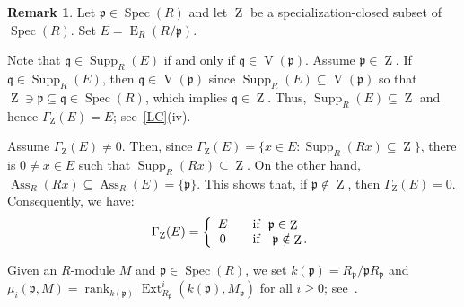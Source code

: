\documentclass[11pt]{amsart}
\theoremstyle{definition}
\theoremstyle{definition}
\newtheorem{rmk}[thm]{Remark}
\numberwithin{equation}{section}
\newcommand{\fp}{\mathfrak{p}}
\newcommand{\fq}{\mathfrak{q}}
\DeclareMathOperator{\Ass}{Ass}
\DeclareMathOperator{\V}{V}
\DeclareMathOperator{\IH}{E}
\DeclareMathOperator{\mz}{Z}
\DeclareMathOperator{\Ext}{Ext}
\DeclareMathOperator{\rank}{rank}
\DeclareMathOperator{\Supp}{Supp}
\DeclareMathOperator{\Spec}{Spec}
\begin{document}
\begin{rmk} \label{g-m} Let $\fp \in \Spec(R)$ and let $\mz$ be a specialization-closed subset of $\Spec(R)$. Set $E=\IH_R(R/\fp)$.

Note that $\fq \in \Supp_R(E)$ if and only if $\fq \in \V(\fp)$. Assume $\fp \in \mz$. If $\fq \in \Supp_R(E)$, then $\fq \in \V(\fp)$ since $\Supp_R(E)\subseteq \V(\fp)$  so that $\mz \owns \fp \subseteq \fq \in \Spec(R)$, which implies $\fq \in \mz$. Thus, $\Supp_R(E)\subseteq \mz$ and hence $\Gamma_{\mz}(E)=E$; see~\ref{LC}(iv).

Assume $\Gamma_{\mz}(E)\neq 0$. Then, since $\Gamma_{\mz}(E)=\{x\in E : \Supp_R(Rx)\subseteq\mz\}$, there is $0\neq x\in E$ such that $\Supp_R(Rx)\subseteq\mz$. On the other hand, $\Ass_R(Rx)\subseteq\Ass_R(E)=\{\fp\}$. This shows that, if $\fp \notin \mz$, then $\Gamma_{\mz}(E)=0$. Consequently, we have:
\begin{equation}\notag{} 
\Gamma_{\mz}(E)=\left\lbrace
\begin{array}{cl}
E\ \ & \text{ if}\ \ \fp\in\mz\\
0\ \ & \text{ if }\ \ \fp\notin\mz.\\
\end{array}\right.
\end{equation}
\end{rmk}

Given an $R$-module $M$ and $\fp \in \Spec(R)$, we set $k(\fp)= R_{\fp} / \fp R_{\fp}$ and $\mu_i(\fp,M)=\rank_{k(\fp)}\Ext^i_{R_{\fp}}(k(\fp), M_{\fp})$ for all $i\geq 0$; see~\cite{BassU}.
\end{document}
